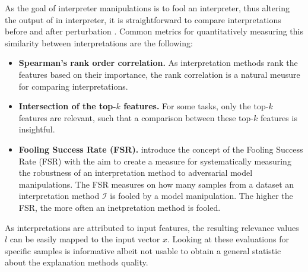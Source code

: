 \par\smallskip
{} 
As the goal of interpreter manipulations is to fool an interpreter, thus altering the output of in interpreter, it is straightforward to compare interpretations before and after perturbation \cite{ghorbani2019interpretation}.
Common metrics for quantitatively measuring this similarity between interpretations are the following: 
\begin{itemize}
    \item \textbf{Spearman's rank order correlation.} As interpretation methods rank the features based on their importance, the rank correlation \cite{spearman1961proof} is a natural meusure for comparing interpretations. 
    \item \textbf{Intersection of the top-$k$ features.} For some tasks, only the top-$k$ features are relevant, such that a comparison between these top-$k$ features is insightful. 
    \item \textbf{Fooling Success Rate (FSR).} \cite{fooling_nn_interpreters} introduce the concept of the Fooling Success Rate (FSR) with the aim to create a measure for systematically measuring the robustness of an interpretation method to adversarial model manipulations. The FSR measures on how many samples from a dataset an interpretation method $\mathcal{I}$ is fooled by a model manipulation. The higher the FSR, the more often an inetpretation method is fooled. 
\end{itemize}

\par\smallskip
{} 
As interpretations are attributed to input features, the resulting relevance values $l$ can be easily mapped to the input vector $x$.
Looking at these evaluations for specific samples is informative albeit not usable to obtain a general statistic about the explanation methods quality.
